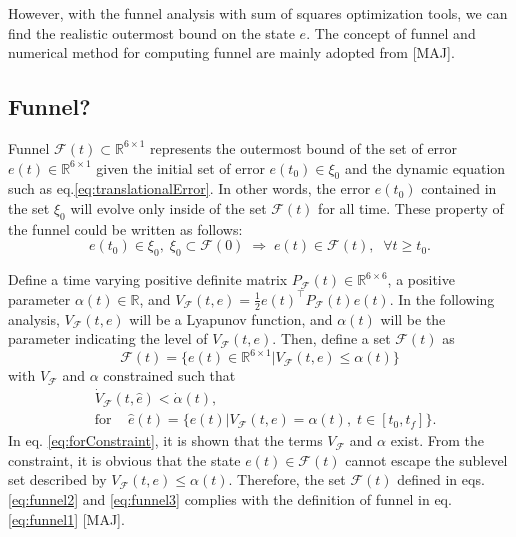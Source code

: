 \documentclass[letterpaper, 10 pt, conference]{ieeeconf}  %
\begin{document}
However, with the funnel analysis with sum of squares optimization tools, we can find the realistic outermost bound on the state $e$.
The concept of funnel and numerical method for computing funnel are mainly adopted from [MAJ]. 
\subsection{Funnel?}
Funnel $\mathcal{F}(t) \subset \mathbb{R}^{6\times 1}$  represents the outermost bound of the set of error $e(t)\in \mathbb{R}^{6\times 1}$ given the initial set of error $e(t_0) \in \xi_0$ and the dynamic equation such as eq.\eqref{eq:translationalError}.
In other words, the error $e(t_0)$ contained in the set $\xi_0$ will evolve only inside of the set $\mathcal{F}(t)$ for all time.
These property of the funnel could be written as follows:
\begin{equation}
e(t_0) \in \xi_0,\;\xi_0 \subset \mathcal{F}(0)\;\Rightarrow\; e(t) \in \mathcal{F}(t),\;\;\forall t \geq t_0. \label{eq:funnel1}
\end{equation}

Define a time varying positive definite matrix $P_\mathcal{F}(t) \in \mathbb{R}^{6\times 6}$, a positive parameter $\alpha(t) \in \mathbb{R}$, and $V_\mathcal{F}(t,e) = \frac{1}{2}e(t)^\intercal P_\mathcal{F}(t) e(t)$.
In the following analysis, $V_\mathcal{F}(t,e)$ will be a Lyapunov function, and $\alpha(t)$ will be the parameter indicating the level of $V_\mathcal{F}(t,e)$.
Then, define a set $\mathcal{F}(t)$ as 
\begin{equation}
\mathcal{F}(t) = \{e(t) \in \mathbb{R}^{6\times 1} | V_\mathcal{F}(t,e) \leq \alpha(t)\} \label{eq:funnel2}
\end{equation}
with $V_\mathcal{F}$ and $\alpha$ constrained such that
\begin{align}
&\dot{V}_\mathcal{F}(t,\hat{e}) < \dot{\alpha}(t), \label{eq:funnel3} \\
&\text{for }\;\;\;\hat{e}(t) = \{e(t)|V_\mathcal{F}(t,e) = \alpha(t),\;t\in[t_0,t_f]\}. \nonumber
\end{align}
In eq. \eqref{eq:forConstraint}, it is shown that the terms $V_\mathcal{F}$ and $\alpha$ exist.
From the constraint, it is obvious that the state $e(t) \in \mathcal{F}(t)$ cannot escape the sublevel set described by $V_\mathcal{F}(t,e) \leq \alpha(t)$.
Therefore, the set $\mathcal{F}(t)$ defined in eqs. \eqref{eq:funnel2} and \eqref{eq:funnel3}
 complies with the definition of funnel in eq. \eqref{eq:funnel1} [MAJ]. 
\end{document}
